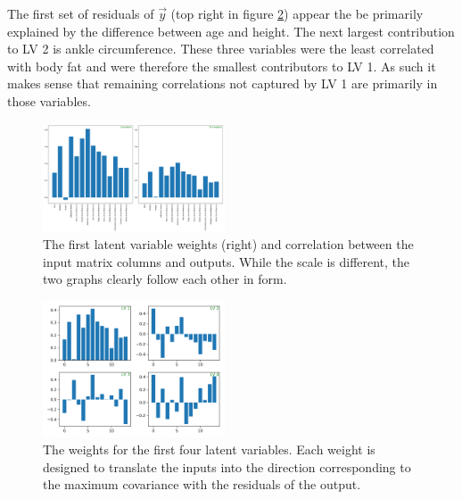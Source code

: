 \documentclass{IEEEtran}
\begin{document}
The first set of residuals of $\vec{y}$ (top right in figure \ref{fig:first_four_latent_variables}) appear the be primarily explained by the difference between age and height. The next largest contribution to LV 2 is ankle circumference. These three variables were the least correlated with body fat and were therefore the smallest contributors to LV 1. As such it makes sense that remaining correlations not captured by LV 1 are primarily in those variables.

\begin{centering}
\begin{figure}
\centering
\begin{center}
	\includegraphics[width=0.48\textwidth]{pls_weights_and_correlation}
	\caption{The first latent variable weights (right) and correlation between the input matrix columns and outputs. While the scale is different, the two graphs clearly follow each other in form.\label{fig:pls_weights_and_correlation}}
\end{center}
\end{figure}
\end{centering}

\begin{centering}
\begin{figure}
\centering
\begin{center}
	\includegraphics[width=0.48\textwidth]{first_four_latent_variables}
	\caption{The weights for the first four latent variables. Each weight is designed to translate the inputs into the direction corresponding to the maximum covariance with the residuals of the output.\label{fig:first_four_latent_variables}}
\end{center}
\end{figure}
\end{centering}
\end{document}
